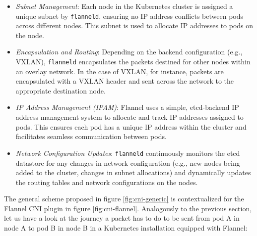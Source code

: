 \begin{itemize}
  \itemsep0em
  \item \textit{Subnet Management}: Each node in the Kubernetes cluster is
    assigned a unique subnet by \texttt{flanneld}, ensuring no IP address
    conflicts between pods across different nodes. This subnet is used to
    allocate IP addresses to pods on the node.
  \item \textit{Encapsulation and Routing}: Depending on the backend
    configuration (e.g., VXLAN), \texttt{flanneld}
    encapsulates the packets destined for other nodes within an overlay network.
    In the case of VXLAN, for instance, packets are encapsulated with a VXLAN
    header and sent across the network to the appropriate destination node.
 \item \textit{IP Address Management (IPAM)}: Flannel uses a simple,
   etcd-backend IP address management system to allocate and track IP addresses
   assigned to pods. This ensures each pod has a unique IP address within the
   cluster and facilitates seamless communication between pods.
  \item \textit{Network Configuration Updates}: \texttt{flanneld} continuously
    monitors the etcd datastore for any changes in network configuration (e.g.,
    new nodes being added to the cluster, changes in subnet allocations) and
    dynamically updates the routing tables and network configurations on the
    nodes.
\end{itemize}

The general scheme proposed in figure \ref{fig:cni-generic} is contextualized
for the Flannel CNI plugin in figure \ref{fig:cni-flannel}.
Analogously to the previous section, let us have a look at the journey a packet
has to do to be sent from pod A in node A to pod B in node B in a Kubernetes
installation equipped with Flannel:

